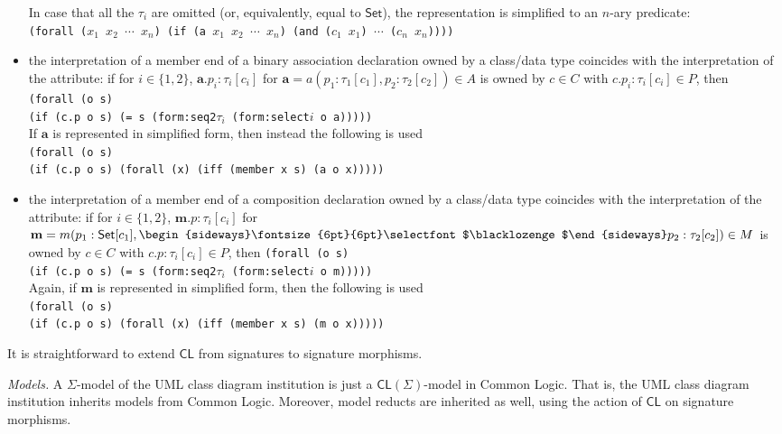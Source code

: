 \documentclass[10pt,fleqn,final]{scrreprt}
\newcommand*{\CL}{\ensuremath{\mathsf{CL}}\xspace}
\newenvironment{definitions}[0]{\medskip }{}
\newcommand{\composition}{\raisebox{0.2pt}{\begin{sideways}\fontsize{6pt}{6pt}\selectfont$\blacklozenge$\end{sideways}}}
\newcommand{\white}[1]{{\color{white}{#1}}}
\newcommand{\qqquad}{\white{x}\qquad}
\begin{document}
\begin{definitions}
\begin{itemize}
In case that all the $\tau_i$ are omitted (or, equivalently, equal to 
$\mathsf{Set}$), the representation is simplified to an $n$-ary predicate:\\
\texttt{(forall ($x_1$ $x_2$ $\cdots$  $x_n$) (if (a $x_1$ $x_2$ $\cdots$  $x_n$) (and ($c_1$ $x_1$) $\cdots$ ($c_n$ $x_n$))))}
\item the interpretation of a member end of a binary association
declaration owned by a class/data type coincides with the interpretation
of the attribute: if for $i\in\{1,2\}$, $\mathbf{a}.p_i : \tau_i[c_i]$ for
$\mathbf{a} = a(p_1 : \tau_1[c_1], p_2 : \tau_2[c_2]) \in A$ is owned by
$c \in C$ with $c.p_i : \tau_i[c_i] \in P$, then\\
\texttt{(forall (o s)\\
\qqquad (if (c.p o s) (= s (form:seq2$\tau_i$ (form:select$i$ o a)))))}\\
If $\mathbf{a}$ is represented in simplified form, then instead the following is used \\
\texttt{(forall (o s)\\
\qqquad (if (c.p o s) (forall (x) (iff (member x s) (a o x)))))}
\item the interpretation of a member end of a composition
declaration  owned by a class/data
type coincides with the interpretation of the attribute: if for
$i\in\{1,2\}$,
$\mathbf{m}.p : \tau_i[c_i]$
for
$\mathbf{m}=m(p_1 : \mathsf{Set}[c_1], \composition p_2 : \tau_2[c_2])
\in M$ is owned by $c \in C$ with $c.p : \tau_i[c_i] \in P$, then
\texttt{(forall (o s)\\
  \qqquad (if (c.p o s) (= s (form:seq2$\tau_i$ (form:select$i$ o m)))))}\\
Again, if $\mathbf{m}$ is represented in simplified form, then the following is used\\
\texttt{(forall (o s)\\
  \qqquad (if (c.p o s) (forall (x) (iff (member x s) (m o x)))))}
\end{itemize}


It is straightforward to extend $\CL$ from signatures to signature morphisms.

\smallskip\noindent
\textit{Models.}
A $\Sigma$-model of the UML class diagram institution is just a
$\CL(\Sigma)$-model in Common Logic. That is, the UML class diagram
institution inherits models from Common Logic. Moreover, model reducts
are inherited as well, using the action of $\CL$ on signature morphisms.



\end{definitions}
\end{document}
